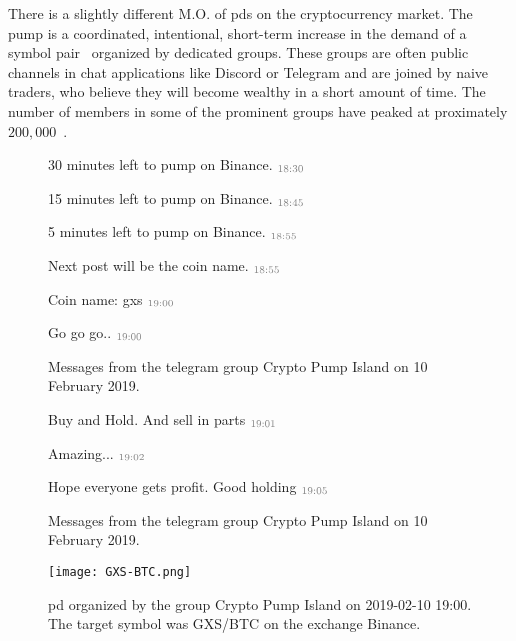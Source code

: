 There is a slightly different M.O. of \acp{pd} on the cryptocurrency market. The pump is a coordinated, intentional, short-term increase in the demand of a symbol pair~\cite{P&D_anatomy} organized by dedicated groups. These groups are often public channels in chat applications like Discord or Telegram and are joined by naive traders, who believe they will become wealthy in a short amount of time. The number of members in some of the prominent groups have peaked at proximately $200,000$~\cite{P&D_the_outline}.



\begin{figure}[ht]
    \begin{leftbubbles}
    30 minutes left to pump on Binance. $\color{gray}_{\text{18:30}}$
    
    15 minutes left to pump on Binance. $\color{gray}_{\text{18:45}}$
    
    5 minutes left to pump on Binance. $\color{gray}_{\text{18:55}}$
    
    Next post will be the coin name. $\color{gray}_{\text{18:55}}$
    
    Coin name: gxs $\color{gray}_{\text{19:00}}$
    
    Go go go.. $\color{gray}_{\text{19:00}}$
    \end{leftbubbles}
    \caption{Messages from the telegram group Crypto Pump Island on 10 February 2019.}
    \label{fig:chat_pump}
\end{figure}

\begin{figure}[ht]
    \begin{leftbubbles}
    Buy and Hold. And sell in parts $\color{gray}_{\text{19:01}}$
    
    Amazing... $\color{gray}_{\text{19:02}}$
    
    Hope everyone gets profit.
    Good holding $\color{gray}_{\text{19:05}}$
    \end{leftbubbles}
    \caption{Messages from the telegram group Crypto Pump Island on 10 February 2019.}
    \label{fig:chat_dump}
\end{figure}



\begin{figure}[ht]
    \centering
    \texttt{[image: GXS-BTC.png]}
    \caption{\ac{pd} organized by the group Crypto Pump Island on 2019-02-10 19:00. The target symbol was GXS/BTC on the exchange Binance.}
    \label{fig:pd-gxsbtc}
\end{figure}

